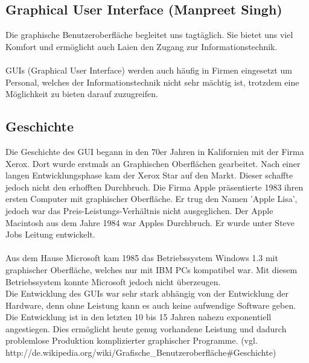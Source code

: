\documentclass[12pt,a4paper]{report}
\begin{document}
\begin{onehalfspace}
\newpage
\section{Graphical User Interface (Manpreet Singh)}
Die graphische Benutzeroberfläche begleitet uns tagtäglich. Sie bietet uns viel Komfort und ermöglicht auch Laien den Zugang zur Informationstechnik.\\\\
GUIs (Graphical User Interface) werden auch häufig in Firmen eingesetzt um Personal, welches der Informationstechnik nicht sehr mächtig ist, trotzdem eine Möglichkeit zu bieten darauf zuzugreifen.
\subsection{Geschichte}
Die Geschichte des GUI begann in den 70er Jahren in Kalifornien mit der Firma Xerox. Dort wurde erstmals an Graphischen Oberflächen gearbeitet. Nach einer langen Entwicklungsphase kam der Xerox Star auf den Markt. Dieser schaffte jedoch nicht den erhofften Durchbruch. Die Firma Apple präsentierte 1983 ihren ersten Computer mit graphischer Oberfläche. Er trug den Namen 'Apple Lisa', jedoch war das Preis-Leistungs-Verhältnis nicht ausgeglichen. Der Apple Macintosh aus dem Jahre 1984 war Apples Durchbruch. Er wurde unter Steve Jobs Leitung entwickelt. \\\\
Aus dem Hause Microsoft kam 1985 das Betriebssystem Windows 1.3 mit graphischer Oberfläche, welches nur mit IBM PCs kompatibel war. Mit diesem Betriebssystem konnte Microsoft jedoch nicht überzeugen.\\

Die Entwicklung des GUIs war sehr stark abhängig von der Entwicklung der Hardware, denn ohne Leistung  kann es auch keine aufwendige Software geben.\\

Die Entwicklung  ist in den letzten 10 bis 15 Jahren nahezu exponentiell angestiegen. Dies ermöglicht heute genug vorhandene Leistung und dadurch problemlose Produktion komplizierter graphischer Programme.  (vgl. http://de.wikipedia.org/wiki/Grafische\_Benutzeroberfläche\#Geschichte)


\end{onehalfspace}
\end{document}
